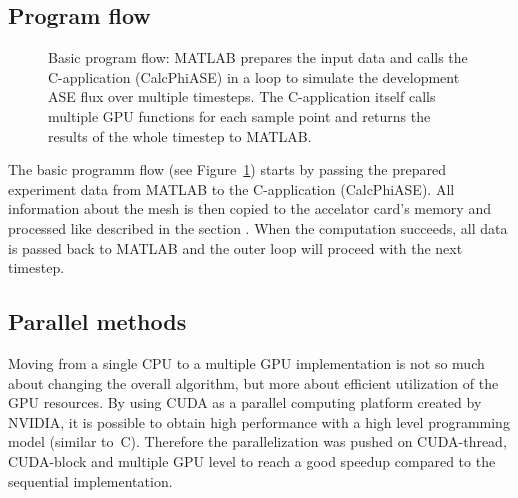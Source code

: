 \subsection{Program flow}
\label{subsec:program_flow}
\begin{figure}[H]
  \centerline
  {}
  \caption{Basic program flow: MATLAB prepares the input data and
    calls the C-application (CalcPhiASE) in a loop to simulate the
    development ASE flux over multiple timesteps. The C-application
    itself calls multiple GPU functions for each sample point and
    returns the results of the whole timestep to MATLAB.}
  \label{graphic:pap1}
\end{figure}
The basic programm flow (see Figure~\ref{graphic:pap1}) starts
by passing the prepared experiment data from MATLAB \cite{matlab}
to the C-application (CalcPhiASE). All information about the mesh is then copied
to the accelator card's memory and processed like described in 
the section . When the computation succeeds, 
all data is passed back to MATLAB and the outer loop will proceed 
with the next timestep. 

\subsection{Parallel methods}
\label{subsec:parallel_methods}
Moving from a single CPU to a multiple
GPU implementation is not so much about changing the overall algorithm,
but more about efficient utilization of the GPU resources. 
By using CUDA\cite{cuda} as a parallel computing platform created by NVIDIA\cite{nvidia},
it is possible to obtain high performance with a high level 
programming model (similar to~C). Therefore the parallelization was pushed on CUDA-thread, 
CUDA-block and multiple GPU level to reach a good speedup compared to 
the sequential implementation. 

